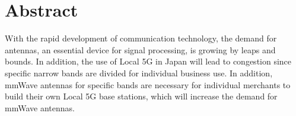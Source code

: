 \documentclass[a4paper,12pt]{report}
\begin{document}
\pagestyle{empty}

\begin{center}
  \end{center}
  
  
  \newpage

\renewcommand{\thepage}{\roman{page}}

\cleardoublepage
\pagestyle{fancy} %
\lhead{\rightmark}

\chapter*{\centering Abstract}

With the rapid development of communication technology, the demand
for antennas, an essential device for signal processing,
is growing by leaps and
bounds. In addition, the use of Local 5G in Japan will lead to congestion
since specific narrow bands are divided for individual business use.
In addition,
mmWave antennas for specific bands are necessary for individual
merchants to build their own Local 5G base stations,
which will increase the
demand for mmWave antennas.
\end{document}
